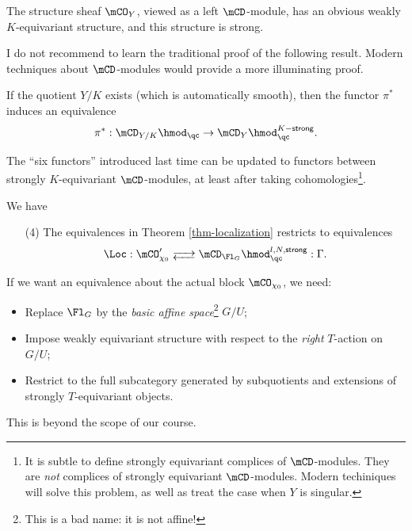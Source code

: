 	\begin{exam}
		The structure sheaf $\mCO_Y$, viewed as a left $\mCD$-module, has an obvious weakly $K$-equivariant structure, and this structure is strong.
	\end{exam}

	I do not recommend to learn the traditional proof of the following result. Modern techniques about $\mCD$-modules would provide a more illuminating proof.

	\begin{prop}
		If the quotient $Y/K$ exists (which is automatically smooth), then the functor $\pi^*$ induces an equivalence
		\[
			\pi^*: \mCD_{Y/K}\hmod_\qc \to \mCD_Y\hmod_\qc^{K-\mathsf{strong}}.
		\]

	\end{prop}

	\begin{exam}
		The ``six functors'' introduced last time can be updated to functors between strongly $K$-equivariant $\mCD$-modules, at least after taking cohomologies\footnote{It is subtle to define strongly equivariant complices of $\mCD$-modules. They are \emph{not} complices of strongly equivariant $\mCD$-modules. Modern techiniques will solve this problem, as well as treat the case when $Y$ is singular.}.
	\end{exam}

	\begin{thm}
		We have
		\begin{itemize}
			\item[(4)]
				The equivalences in Theorem \ref{thm-localization} restricts to equivalences
				\[
					\Loc: \mCO_{\chi_0}' \adj \mCD_{\Fl_G}\hmod_\qc^{l,N,\mathsf{strong}} : \Gamma.
				\]
		\end{itemize}
		
	\end{thm}
	
	\begin{rem}
		If we want an equivalence about the actual block $\mCO_{\chi_0}$, we need:
		\begin{itemize}
			\item 
				Replace $\Fl_G$ by the \emph{basic affine space}\footnote{This is a bad name: it is not affine!} $G/U$;
			\item
				Impose weakly equivariant structure with respect to the \emph{right} $T$-action on $G/U$;
			\item
				Restrict to the full subcategory generated by subquotients and extensions of strongly $T$-equivariant objects.
		\end{itemize}
		This is beyond the scope of our course.

	\end{rem}


